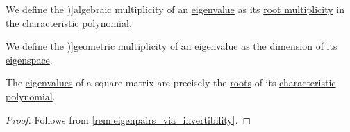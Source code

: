 \begin{definition}\label{def:eigenpair_multiplicity}
  We define the \term[ru=алгебраическая кратность, en=algebraic multiplicity (\cite[def. VI.6.17]{Aluffi2009Algebra})]{algebraic multiplicity} of an \hyperref[def:eigenpair]{eigenvalue} as its \hyperref[def:polynomial_root_multiplicity]{root multiplicity} in the \hyperref[def:linear_operator_characteristic_polynomial]{characteristic polynomial}.

  We define the \term[ru=геометрическая кратность, en=geometric multiplicity (\cite[def. VI.6.20]{Aluffi2009Algebra})]{geometric multiplicity} of an eigenvalue as the dimension of its \hyperref[def:eigenspace]{eigenspace}.
\end{definition}

\begin{proposition}\label{thm:eigenvalues_and_characteristic_polynomials}
  The \hyperref[def:eigenpair]{eigenvalues} of a square matrix are precisely the \hyperref[def:polynomial_root_multiplicity]{roots} of its \hyperref[def:linear_operator_characteristic_polynomial]{characteristic polynomial}.
\end{proposition}
\begin{proof}
  Follows from \cref{rem:eigenpairs_via_invertibility}.
\end{proof}

